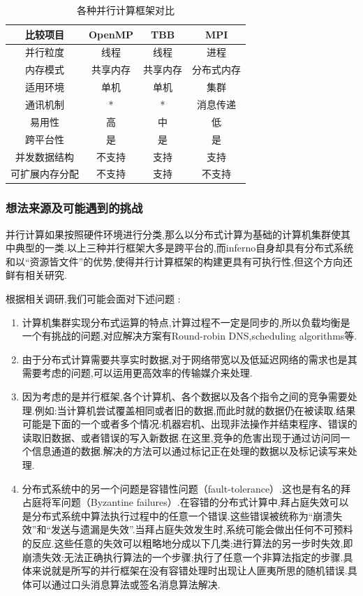 \documentclass[paper=a4]{ctexart} %
\numberwithin{equation}{section} %
\numberwithin{figure}{section} %
\numberwithin{table}{section} %
\newcommand{\n}{\\\indent}
\begin{document}
\begin{table}[!hpb]
  \centering
  \begin{tabular}{|c|c|c|c|}
    \hline
    比较项目 & OpenMP & TBB & MPI \\ 
    \hline
    并行粒度 & 线程 & 线程 & 进程 \\
    内存模式 & 共享内存&共享内存&分布式内存\\
    适用环境 & 单机 & 单机 & 集群\\
    通讯机制&*&*&消息传递 \\
    易用性 & 高& 中 & 低 \\
    跨平台性 & 是&是&是\\
    并发数据结构 & 不支持 &支持&支持\\
    可扩展内存分配&不支持&支持&不支持\\
    \hline
  \end{tabular}
\caption{各种并行计算框架对比}
\end{table}

\subsubsection{想法来源及可能遇到的挑战}
并行计算如果按照硬件环境进行分类,那么以分布式计算为基础的计算机集群使其中典型的一类.以上三种并行框架大多是跨平台的,而inferno自身却具有分布式系统和以“资源皆文件”的优势,使得并行计算框架的构建更具有可执行性,但这个方向还鲜有相关研究.\n

根据相关调研,我们可能会面对下述问题 : 
\begin{enumerate}
\item 计算机集群实现分布式运算的特点,计算过程不一定是同步的,所以负载均衡是一个有挑战的问题,对应解决方案有Round-robin DNS,scheduling algorithms等.
\item 由于分布式计算需要共享实时数据,对于网络带宽以及低延迟网络的需求也是其需要考虑的问题,可以运用更高效率的传输媒介来处理.
\item 因为考虑的是并行框架,各个计算机、各个数据以及各个指令之间的竞争需要处理.例如:当计算机尝试覆盖相同或者旧的数据,而此时就的数据仍在被读取.结果可能是下面的一个或者多个情况:机器宕机、出现非法操作并结束程序、错误的读取旧数据、或者错误的写入新数据.在这里,竞争的危害出现于通过访问同一个信息通道的数据.解决的方法可以通过标记正在处理的数据以及标记读写来处理.   
\item 分布式系统中的另一个问题是容错性问题（fault-tolerance）.这也是有名的拜占庭将军问题（Byzantine failures）.在容错的分布式计算中,拜占庭失效可以是分布式系统中算法执行过程中的任意一个错误.这些错误被统称为“崩溃失效”和“发送与遗漏是失效”.当拜占庭失效发生时,系统可能会做出任何不可预料的反应.这些任意的失效可以粗略地分成以下几类;进行算法的另一步时失效,即崩溃失效:无法正确执行算法的一个步骤;执行了任意一个非算法指定的步骤.具体来说就是所写的并行框架在没有容错处理时出现让人匪夷所思的随机错误.具体可以通过口头消息算法或签名消息算法解决.
\end{enumerate}
\end{document}
